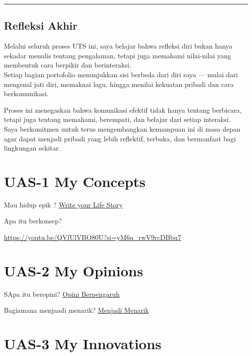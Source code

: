 \documentclass[
  letterpaper,
  DIV=11,
  numbers=noendperiod]{scrreprt}
\begin{document}
\begin{center}\rule{0.5\linewidth}{0.5pt}\end{center}

\section*{Refleksi Akhir}\label{refleksi-akhir-1}


Melalui seluruh proses UTS ini, saya belajar bahwa refleksi diri bukan
hanya sekadar menulis tentang pengalaman, tetapi juga memahami
nilai-nilai yang membentuk cara berpikir dan berinteraksi.\\
Setiap bagian portofolio menunjukkan sisi berbeda dari diri saya ---
mulai dari mengenal jati diri, memaknai lagu, hingga menilai kekuatan
pribadi dan cara berkomunikasi.

Proses ini menegaskan bahwa komunikasi efektif tidak hanya tentang
berbicara, tetapi juga tentang memahami, berempati, dan belajar dari
setiap interaksi.\\
Saya berkomitmen untuk terus mengembangkan kemampuan ini di masa depan
agar dapat menjadi pribadi yang lebih reflektif, terbuka, dan bermanfaat
bagi lingkungan sekitar.


\chapter{UAS-1 My Concepts}\label{uas-1-my-concepts}

Mau hidup epik ? \href{lifestory.pdf}{Write your Life Story}

Apa itu berkonsep?

\url{https://youtu.be/QVfUlVBO80U?si=yM6q_rwV9rcDBbu7}


\chapter{UAS-2 My Opinions}\label{uas-2-my-opinions}

SApa itu beropini? \href{BM\%20Opini.mp4}{Opini Berpengaruh}

Bagiamana menjaadi menarik? \href{./Interesting.mp4}{Menjadi Menarik}


\chapter{UAS-3 My Innovations}\label{uas-3-my-innovations}
\end{document}
